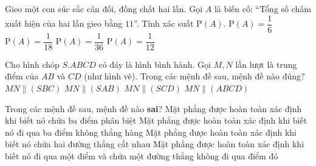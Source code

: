 \begin{ex}%
Gieo một con súc sắc cân đối, đồng chất hai lần. Gọi $A$ là biến cố: ``Tổng số chấm xuất hiện của hai lần gieo bằng $11$''. Tính xác suất $\mathrm{P}(A)$.
	\choice
	{$\mathrm{P}(A)=\dfrac{1}{6}$}
	{\True $\mathrm{P}(A)=\dfrac{1}{18}$}
	{$\mathrm{P}(A)=\dfrac{1}{36}$}
	{$\mathrm{P}(A)=\dfrac{1}{12}$}
\end{ex}

\begin{ex}%
\immini
{Cho hình chóp $S.ABCD$ có đáy là hình bình hành. Gọi $M, N$ lần lượt là trung điểm của $AB$ và $CD$ (như hình vẽ). Trong các mệnh đề sau, mệnh đề nào đúng?
	\choice
	{\True $MN\parallel (SBC)$}
	{$MN\parallel (SAB)$}
	{$MN\parallel (SCD)$}
	{$MN\parallel (ABCD)$}
}
{
}
\end{ex}

\begin{ex}%
Trong các mệnh đề sau, mệnh đề nào \textbf{sai}?
	\choice
	{\True Mặt phẳng được hoàn toàn xác định khi biết nó chứa ba điểm phân biệt}
	{Mặt phẳng được hoàn toàn xác định khi biết nó đi qua ba điểm không thẳng hàng}
	{Mặt phẳng được hoàn toàn xác định khi biết nó chứa hai đường thẳng cắt nhau}
	{Mặt phẳng được hoàn toàn xác định khi biết nó đi qua một điểm và chứa một đường thẳng không đi qua điểm đó}
\loigiai{
}
\end{ex}

